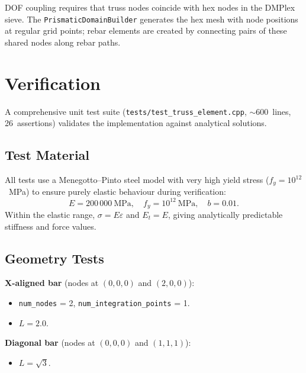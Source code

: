 \noindent DOF coupling requires that truss nodes coincide with hex nodes
in the DMPlex sieve.  The \texttt{PrismaticDomainBuilder} generates the
hex mesh with node positions at regular grid points; rebar elements are
created by connecting pairs of these shared nodes along rebar paths.


\section{Verification}
\label{sec:truss-verification}

A comprehensive unit test suite (\texttt{tests/test\_truss\_element.cpp},
$\sim$600~lines, 26~assertions) validates the implementation against
analytical solutions.

\subsection{Test Material}
\label{sec:truss-test-material}

All tests use a Menegotto--Pinto steel model with very high yield stress
($f_y = 10^{12}$~MPa) to ensure purely elastic behaviour during
verification:
\begin{equation}
    E = 200\,000~\text{MPa}, \quad f_y = 10^{12}~\text{MPa}, \quad b = 0.01.
\end{equation}
Within the elastic range, $\sigma = E\varepsilon$ and $E_t = E$, giving
analytically predictable stiffness and force values.

\subsection{Geometry Tests}
\label{sec:truss-geometry-tests}

\textbf{X-aligned bar} (nodes at $(0,0,0)$ and $(2,0,0)$):
\begin{itemize}
    \item \texttt{num\_nodes} = 2, \texttt{num\_integration\_points} = 1.
    \item $L = 2.0$.
\end{itemize}

\textbf{Diagonal bar} (nodes at $(0,0,0)$ and $(1,1,1)$):
\begin{itemize}
    \item $L = \sqrt{3}$.
\end{itemize}

